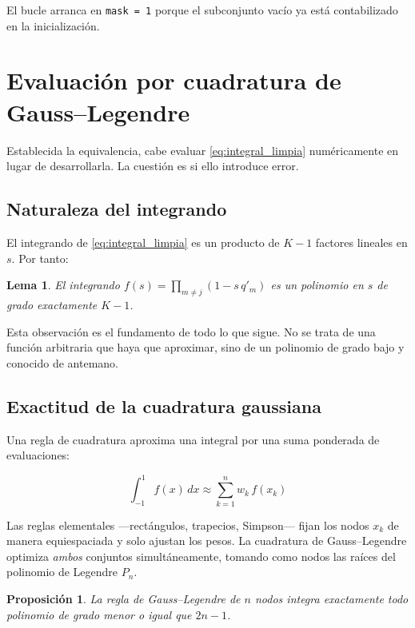 \documentclass[a4paper, 12pt]{article}
\newtheorem{proposicion}{Proposición}
\newtheorem{lema}{Lema}
\begin{document}
El bucle arranca en \texttt{mask = 1} porque el subconjunto vacío ya está contabilizado en la inicialización.

\newpage

\section{Evaluación por cuadratura de Gauss--Legendre}

Establecida la equivalencia, cabe evaluar \eqref{eq:integral_limpia} numéricamente en lugar de desarrollarla. La cuestión es si ello introduce error.

\subsection{Naturaleza del integrando}

El integrando de \eqref{eq:integral_limpia} es un producto de $K-1$ factores lineales en $s$. Por tanto:

\begin{lema}
El integrando $f(s) = \prod_{m \neq j} (1 - s\,q'_m)$ es un polinomio en $s$ de grado exactamente $K-1$.
\end{lema}

Esta observación es el fundamento de todo lo que sigue. No se trata de una función arbitraria que haya que aproximar, sino de un polinomio de grado bajo y conocido de antemano.

\subsection{Exactitud de la cuadratura gaussiana}

Una regla de cuadratura aproxima una integral por una suma ponderada de evaluaciones:

\begin{equation}
\int_{-1}^{1} f(x)\, dx \approx \sum_{k=1}^{n} w_k\, f(x_k)
\end{equation}

Las reglas elementales —rectángulos, trapecios, Simpson— fijan los nodos $x_k$ de manera equiespaciada y solo ajustan los pesos. La cuadratura de Gauss--Legendre optimiza \emph{ambos} conjuntos simultáneamente, tomando como nodos las raíces del polinomio de Legendre $P_n$.

\begin{proposicion}
La regla de Gauss--Legendre de $n$ nodos integra exactamente todo polinomio de grado menor o igual que $2n-1$.
\end{proposicion}
\end{document}
